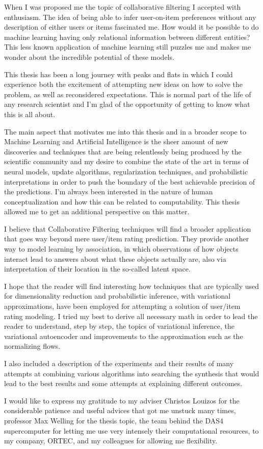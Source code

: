 
When I was proposed me the topic
of collaborative filtering
I accepted with enthusiasm.
The idea of being able to infer user-on-item preferences
without any description of either users
or items fascinated me. How would it be
possible to do machine learning
having only relational information between different
entities? This less known application of machine learning still puzzles me and makes me
wonder about the incredible potential of these models.

This thesis has been a long journey with peaks and flats in which I could
experience both the excitement of attempting new 
ideas on how to solve the problem, as well as reconsidered expectations.
This is normal part of the life of any research scientist
and I'm glad of the opportunity of getting to know what this is all about.

The main aspect that motivates me into this thesis and in a broader scope to
Machine Learning and Artificial Intelligence is the sheer amount of new discoveries and
techniques that are being relentlessly being produced by the scientific community
and my desire to combine the state of the art in terms of neural models, 
update algorithms,
regularization techniques,
and probabilistic interpretations in order to push the boundary
of the best achievable precision of the predictions.
I'm always been interested in the nature of human conceptualization
and how this can be related to computability. This thesis
allowed me to get an additional perspective on this matter.

I believe that Collaborative Filtering techniques will find a broader application
that goes way beyond mere user/item rating prediction. They provide another way
to model learning by association, in which observations of how objects interact
lead to answers about what these objects actually are, also via interpretation
of their location in the so-called latent space.

I hope that the reader will find interesting how techniques that are typically
used for dimensionality reduction and probabilistic inference, with variational
approximations, have been employed for attempting a solution of
user/item rating modeling. I tried my best to derive all necessary math
in order to lead the reader to understand, step by step, the topics of
variational inference, the variational autoencoder and improvements to
the approximation such as the normalizing flows.

I also included a description of the experiments and their results of
many attempts at combining various algorithms
into searching
the synthesis that would lead to the best results
and some attempts at explaining different outcomes.


I would like to express my gratitude to my adviser 
Christos Louizos for the considerable patience and
useful advices that got me unstuck many times, 
professor Max Welling for the thesis topic, the team behind the DAS4
supercomputer
\cite{das} for letting me use very intensely their computational resources,
to my company, ORTEC, and my colleagues for allowing me flexibility.



